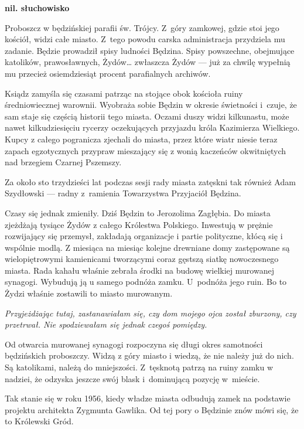 \documentclass[11pt,a4paper,oneside]{article}
\begin{document}
\noindent
\textbf{nil. słuchowisko}

Proboszcz w będzińskiej parafii św. Trójcy. Z~góry zamkowej,
gdzie stoi jego kościół, widzi całe miasto. Z~tego powodu carska
administracja przydziela mu zadanie. Będzie prowadził spisy ludności
Będzina. Spisy powszechne, obejmujące katolików, prawosławnych,
Żydów\dots{} zwłaszcza Żydów --- już za chwilę wypełnią mu przecież
osiemdziesiąt procent parafialnych archiwów.

Ksiądz zamyśla się czasami patrząc na stojące obok kościoła ruiny
średniowiecznej warownii. Wyobraża sobie Będzin w okresie świetności
i~czuje, że sam staje się częścią historii tego miasta. Oczami
duszy widzi kilkunastu, może nawet kilkudziesięciu rycerzy
oczekujących przyjazdu króla Kazimierza Wielkiego. Kupcy z całego 
pogranicza zjechali do miasta, przez które wiatr niesie teraz zapach
egzotycznych przypraw mieszający się z wonią kaczeńców okwitniętych
nad brzegiem Czarnej Pszemszy.

Za około sto trzydzieści lat podczas sesji rady miasta zatęskni tak również Adam
Szydłowski --- radny z~ramienia Towarzystwa Przyjaciół Będzina.

Czasy się jednak zmieniły. Dziś Będzin to Jerozolima Zagłębia. Do
miasta zjeżdżają tysiące Żydów z całego Królestwa Polskiego. Inwestują
w prężnie rozwijający się przemysł, zakładają organizacje i partie
polityczne, kłócą się i wspólnie modlą. Z miesiąca na miesiąc kolejne
drewniane domy zastępowane są wielopiętrowymi kamienicami tworzącymi
coraz gęstszą siatkę nowoczesnego miasta. Rada kahału właśnie zebrała
środki na budowę wielkiej murowanej synagogi. Wybudują ją u samego
podnóża zamku. U~podnóża jego ruin. Bo to Żydzi właśnie zostawili to
miasto murowanym.

\emph{Przyjeżdżając tutaj, zastanawiałam się, czy dom mojego ojca został
zburzony, czy przetrwał. Nie spodziewałam się jednak czegoś pomiędzy.}

Od otwarcia murowanej synagogi rozpoczyna się długi okres samotności
będzińskich proboszczy. Widzą z góry miasto i wiedzą, że nie należy
już do nich. Są katolikami, należą do mniejszości. Z~tęsknotą patrzą
na ruiny zamku w nadziei, że odzyska jeszcze swój blask i~dominującą
pozycję w~mieście.

Tak stanie się w roku 1956, kiedy władze miasta odbudują zamek na
podstawie projektu architekta Zygmunta Gawlika. Od tej pory o Będzinie
znów mówi się, że to Królewski Gród.
\end{document}
